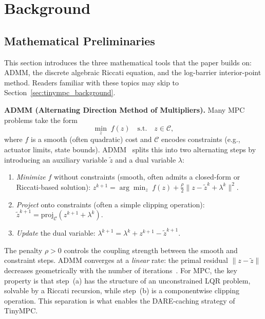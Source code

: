 \section{Background}\label{sec:background}

\subsection{Mathematical Preliminaries}\label{sec:prelim}

This section introduces the three mathematical tools that
the paper builds on: ADMM, the discrete algebraic Riccati
equation, and the log-barrier interior-point method.
Readers familiar with these topics may skip to
Section~\ref{sec:tinympc_background}.

\textbf{ADMM (Alternating Direction Method of Multipliers).}
Many MPC problems take the form
\begin{equation}\label{eq:admm_generic}
  \min_{z} \; f(z) \quad \text{s.t.} \quad z \in \mathcal{C},
\end{equation}
where $f$ is a smooth (often quadratic) cost and $\mathcal{C}$
encodes constraints (e.g., actuator limits, state bounds).
ADMM~\cite{boyd2011} splits this into two alternating steps
by introducing an auxiliary variable $\tilde{z}$ and a dual
variable $\lambda$:
\begin{enumerate}[label=(\alph*)]
  \item \emph{Minimize} $f$ without constraints (smooth, often
    admits a closed-form or Riccati-based solution):
    $z^{k+1} = \arg\min_z \; f(z) + \tfrac{\rho}{2}\|z - \tilde{z}^k + \lambda^k\|^2$.
  \item \emph{Project} onto constraints (often a simple clipping
    operation):
    $\tilde{z}^{k+1} = \mathrm{proj}_{\mathcal{C}}(z^{k+1} + \lambda^k)$.
  \item \emph{Update} the dual variable:
    $\lambda^{k+1} = \lambda^k + z^{k+1} - \tilde{z}^{k+1}$.
\end{enumerate}
The penalty $\rho > 0$ controls the coupling strength between
the smooth and constraint steps.
ADMM converges at a \emph{linear} rate: the primal residual
$\|z - \tilde{z}\|$ decreases geometrically with the number
of iterations~\cite{boyd2011}.
For MPC, the key property is that step~(a) has the structure
of an unconstrained LQR problem, solvable by a Riccati
recursion, while step~(b) is a componentwise clipping
operation.
This separation is what enables the DARE-caching strategy
of TinyMPC.

